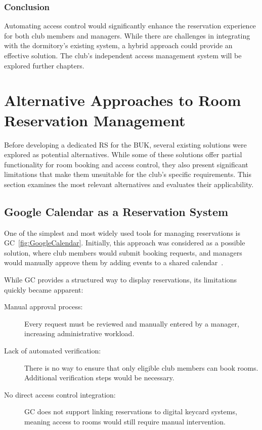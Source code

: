 \subsubsection{Conclusion}

Automating access control would significantly enhance the reservation experience for both club members and managers. While there are challenges in integrating with the dormitory’s existing system, a hybrid approach could provide an effective solution. The club’s independent access management system will be explored further chapters.

\section{Alternative Approaches to Room Reservation Management}

Before developing a dedicated RS for the BUK, several existing solutions were explored as potential alternatives. While some of these solutions offer partial functionality for room booking and access control, they also present significant limitations that make them unsuitable for the club’s specific requirements. This section examines the most relevant alternatives and evaluates their applicability.

\subsection{Google Calendar as a Reservation System}

One of the simplest and most widely used tools for managing reservations is GC~\ref{fig:GoogleCalendar}. Initially, this approach was considered as a possible solution, where club members would submit booking requests, and managers would manually approve them by adding events to a shared calendar~\cite{googleCalendar}.

While GC provides a structured way to display reservations, its limitations quickly became apparent:
\begin{description}
  \item [Manual approval process:] Every request must be reviewed and manually entered by a manager, increasing administrative workload.
  \item [Lack of automated verification:] There is no way to ensure that only eligible club members can book rooms. Additional verification steps would be necessary.
  \item [No direct access control integration:] GC does not support linking reservations to digital keycard systems, meaning access to rooms would still require manual intervention.
\end{description}

